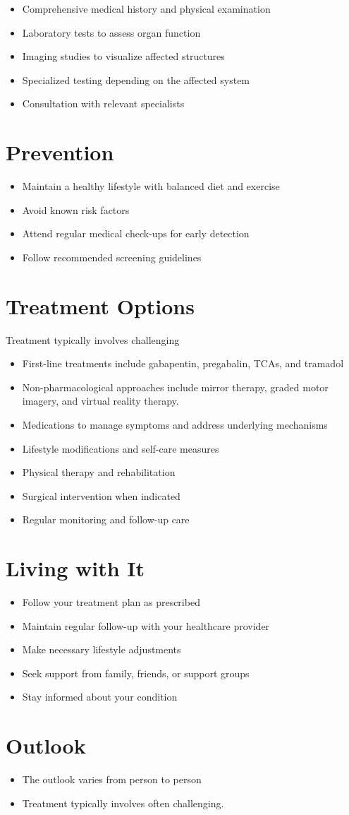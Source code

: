 \begin{itemize}[noitemsep]
  \item Comprehensive medical history and physical examination
  \item Laboratory tests to assess organ function
  \item Imaging studies to visualize affected structures
  \item Specialized testing depending on the affected system
  \item Consultation with relevant specialists
\end{itemize}
\section{Prevention}
\begin{itemize}[noitemsep]
  \item Maintain a healthy lifestyle with balanced diet and exercise
  \item Avoid known risk factors
  \item Attend regular medical check-ups for early detection
  \item Follow recommended screening guidelines
\end{itemize}
\section{Treatment Options}
Treatment typically involves challenging

\begin{itemize}[noitemsep]
  \item First-line treatments include gabapentin, pregabalin, TCAs, and tramadol
  \item Non-pharmacological approaches include mirror therapy, graded motor imagery, and virtual reality therapy.
  \item Medications to manage symptoms and address underlying mechanisms
  \item Lifestyle modifications and self-care measures
  \item Physical therapy and rehabilitation
  \item Surgical intervention when indicated
  \item Regular monitoring and follow-up care
\end{itemize}
\section{Living with It}
\begin{itemize}[noitemsep]
  \item Follow your treatment plan as prescribed
  \item Maintain regular follow-up with your healthcare provider
  \item Make necessary lifestyle adjustments
  \item Seek support from family, friends, or support groups
  \item Stay informed about your condition
\end{itemize}
\section{Outlook}
\begin{itemize}[noitemsep]
  \item The outlook varies from person to person
  \item Treatment typically involves often challenging.
\end{itemize}

